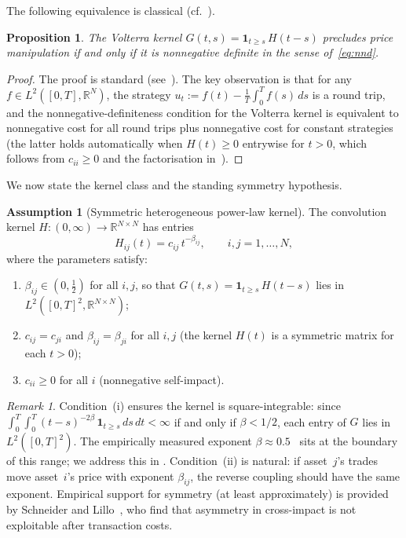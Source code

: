 \documentclass[12pt]{article}
\newtheorem{proposition}[theorem]{Proposition}
\theoremstyle{definition}
\newtheorem{assumption}[theorem]{Assumption}
\theoremstyle{remark}
\newtheorem{remark}[theorem]{Remark}
\newcommand{\R}{\mathbb{R}}
\begin{document}
The following equivalence is classical
(cf.~\cite{HubermanStanzl2004,GatheralSchiedSlynko2012,AbiJaberNeumanTuschmann2026}).

\begin{proposition}\label{prop:equiv}
The Volterra kernel $G(t,s) = \mathbf{1}_{t\ge s}\,H(t-s)$ precludes price manipulation
if and only if it is nonnegative definite in the sense of~\eqref{eq:nnd}.
\end{proposition}

\begin{proof}
The proof is standard (see~\cite[Proposition~2.4]{AbiJaberNeumanTuschmann2026}).
The key observation is that for any $f\in L^2([0,T],\R^N)$, the strategy
$u_t := f(t) - \frac{1}{T}\int_0^T f(s)\,ds$ is a round trip, and the
nonnegative-definiteness condition for the Volterra kernel is equivalent to
nonnegative cost for all round trips plus nonnegative cost for constant strategies
(the latter holds automatically when $H(t)\ge 0$ entrywise for $t>0$,
which follows from $c_{ii}\ge 0$ and the factorisation in~).
\end{proof}

We now state the kernel class and the standing symmetry hypothesis.

\begin{assumption}[Symmetric heterogeneous power-law kernel]\label{ass:kernel}
The convolution kernel $H:(0,\infty)\to\R^{N\times N}$ has entries
\begin{equation}\label{eq:kernel}
  H_{ij}(t) = c_{ij}\,t^{-\beta_{ij}},\qquad i,j=1,\dots,N,
\end{equation}
where the parameters satisfy:
\begin{enumerate}[label=(\roman*),nosep]
  \item $\beta_{ij}\in(0,\tfrac12)$ for all $i,j$, so that
    $G(t,s) = \mathbf{1}_{t\ge s}\,H(t-s)$ lies in $L^2([0,T]^2,\R^{N\times N})$;
  \item $c_{ij} = c_{ji}$ and $\beta_{ij}=\beta_{ji}$ for all $i,j$
    (the kernel $H(t)$ is a symmetric matrix for each $t>0$);
  \item $c_{ii}\ge 0$ for all $i$ (nonnegative self-impact).
\end{enumerate}
\end{assumption}

\begin{remark}\label{rem:L2}
Condition~(i) ensures the kernel is square-integrable: since
$\int_0^T\!\int_0^T (t-s)^{-2\beta}\,\mathbf{1}_{t\ge s}\,ds\,dt < \infty$
if and only if $\beta < 1/2$, each entry of $G$ lies in $L^2([0,T]^2)$.
The empirically measured exponent $\beta\approx 0.5$~\cite{MLKB2026} sits at
the boundary of this range; we address this in .
Condition~(ii) is natural: if asset~$j$'s trades move asset~$i$'s price
with exponent $\beta_{ij}$, the reverse coupling should have the same exponent.
Empirical support for symmetry (at least approximately) is provided by
Schneider and Lillo~\cite{SchneiderLillo2019}, who find that asymmetry
in cross-impact is not exploitable after transaction costs.
\end{remark}
\end{document}
